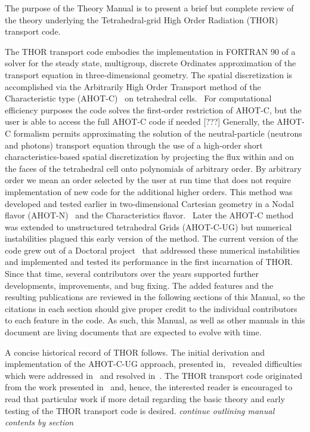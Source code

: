 The purpose of the Theory Manual is to present a brief but complete review of the theory underlying the Tetrahedral-grid High Order Radiation (THOR) transport code.

The THOR transport code embodies the implementation in FORTRAN 90 of a solver for the steady state, multigroup, discrete Ordinates approximation of the transport equation in three-dimensional geometry. The spatial discretization is accomplished via the Arbitrarily High Order Transport method of the Characteristic type (AHOT-C)~\cite{Azmy1992} on tetrahedral cells.~\cite{Ferrer2012} For computational efficiency purposes the code solves the first-order restriction of AHOT-C, but the user is able to access the full AHOT-C code if needed [???] Generally, the AHOT-C formalism permits approximating the solution of the neutral-particle (neutrons and photons) transport equation through the use of a high-order short characteristics-based spatial discretization by projecting the flux within and on the faces of the tetrahedral cell onto polynomials of arbitrary order. By arbitrary order we mean an order selected by the user at run time that does not require implementation of new code for the additional higher orders. This method was developed and tested earlier in two-dimensional Cartesian geometry in a Nodal flavor (AHOT-N)~\cite{Azmy1988a} and the Characteristics flavor.~\cite{Azmy1992} Later the AHOT-C method was extended to unstructured tetrahedral Grids (AHOT-C-UG) but numerical instabilities plagued this early version of the method. The current version of the code grew out of a Doctoral project~\cite{FerrerPhD} that addressed these numerical instabilities and implemented and tested its performance in the first incarnation of THOR. Since that time, several contributors over the years supported further developments, improvements, and bug fixing. The added features and the resulting publications are reviewed in the following sections of this Manual, so the citations in each section should give proper credit to the individual contributors to each feature in the code. As such, this Manual, as well as other manuals in this document are living documents that are expected to evolve with time.

A concise historical record of THOR follows. The initial derivation and implementation of the AHOT-C-UG approach, presented in,~\cite{Azmy2001} revealed difficulties which were addressed in~\cite{Ferrer2009} and resolved in~\cite{FerrerPhD}. The THOR transport code originated from the work presented in~\cite{FerrerPhD} and, hence, the interested reader is encouraged to read that particular work if more detail regarding the basic theory and early testing of the THOR transport code is desired. \textit{continue outlining manual contents by section}

